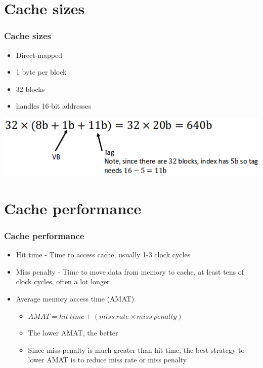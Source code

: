 \documentclass{beamer}
\begin{document}
\section{Cache sizes}
\begin{frame}
\frametitle{Cache sizes}
\begin{itemize}
\item Direct-mapped
\item 1 byte per block
\item 32 blocks
\item handles 16-bit addresses
\end{itemize}
\includegraphics[scale=0.4]{size.png}
\end{frame}
\section{Cache performance}
\begin{frame}
\frametitle{Cache performance}
\begin{itemize}
\item {\color{red}Hit time} - Time to access cache, usually 1-3 clock cycles
\item {\color{green}Miss penalty} - Time to move data from memory to cache, at least tens of clock cycles, often a lot longer
\item {\color{orange}Average memory access time (AMAT)}
\begin{itemize}
\item $AMAT=hit \ time + (miss \ rate \times miss \ penalty)$
\item The lower AMAT, the better
\item Since miss penalty is much greater than hit time, the best strategy to lower AMAT is to reduce miss rate or miss penalty
\end{itemize}
\end{itemize}
\end{frame}
\end{document}
